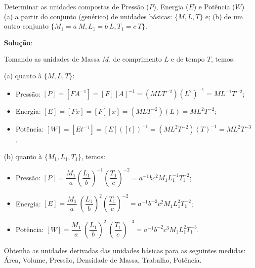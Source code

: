     \begin{exercise}
    Determinar as unidades compostas de Pressão (\(P\)), Energia (\(E\)) e Potência (\(W\)) (a) a partir do conjunto (genérico) de unidades básicas: \(\{M, L, T\}\) e; (b) de um outro conjunto \(\{M_{1} = a\ M, L_1 = b\ L, T_1 = c\ T\}\).
    \end{exercise}

    \textbf{Solução}:
    {\color{orange}
    Tomando as unidades de Massa \(M\), de comprimento \(L\) e de tempo \(T\), temos:

    (a) quanto à \(\{M, L , T\}\):
    
    \begin{itemize}
    \item Pressão: \([P] = [F A^{-1}] = [F][A]^{-1} = (MLT^{-2}) (L^2)^{-1} = M L^{-1} T^{-2}\);
    \item Energia: \([E] = [F x] = [F][x] = (M LT^{-2}) (L) = ML^{2}T^{-2}\);
    \item Potência: \([W] = [Et^{-1}] = [E]([t])^{-1} = (ML^{2}T^{-2})(T)^{-1} = ML^{2}T^{-3}\).
    \end{itemize}
    
    (b) quanto à \(\{M_1, L_1, T_1\}\), temos:
    
    \begin{itemize}
    \item Pressão: \([P] = \dfrac{M_1}{a} \left(\dfrac{L_1}{b}\right)^{-1} \left(\dfrac{T_1}{c}\right)^{-2} = a^{-1}bc^2 M_1 L_1^{-1} T_1^{-2}\);
    \item Energia: \([E] = \dfrac{M_1}{a}\ \left(\dfrac{L_1}{b}\right)^{2} \left(\dfrac{T_1}{c}\right)^{-2} = a^{-1}b^{-2}c^2 M_1L_1^{2}T_1^{-2}\);
    \item Potência: \([W] = \dfrac{M_1}{a}\ \left(\dfrac{L_1}{b}\right)^{2}\ \left(\dfrac{T_1}{c}\right)^{-3} = a^{-1} b^{-2} c^3 M_1L_1^{2}T_1^{-3}\).
    \end{itemize}
    }
    
    \begin{exercise}
    Obtenha as unidades derivadas das unidades básicas para as seguintes medidas: Área, Volume, Pressão, Densidade de Massa, Trabalho, Potência.
    \end{exercise}
    
